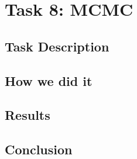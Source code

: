 \section{Task 8: MCMC}
\subsection{Task Description}
\subsection{How we did it}
\subsection{Results}
\subsection{Conclusion}